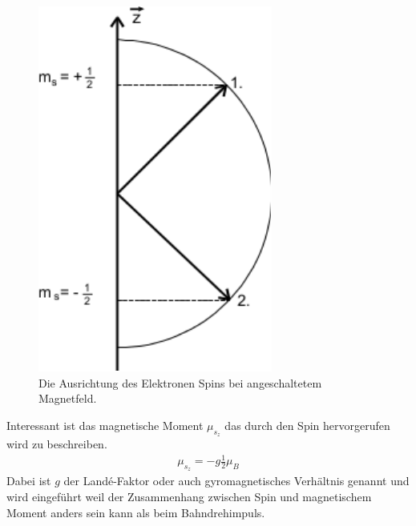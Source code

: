 \begin{figure}[h!]
\centering
\includegraphics[width=\textwidth/4]{../Grafiken/SpinElektron.pdf}
\caption{Die Ausrichtung des Elektronen Spins bei angeschaltetem Magnetfeld.\cite{V28}}\label{fig:ResonanzTheo}
\end{figure}
Interessant ist das magnetische Moment $\mu_{s_z}$ das durch den Spin hervorgerufen wird zu beschreiben.
\begin{align}
	\mu_{s_z}=-g\frac{1}{2}\mu_B\label{eq:musz}
\end{align}
Dabei ist $g$ der Landé-Faktor oder auch gyromagnetisches  Verhältnis genannt und wird eingeführt weil der Zusammenhang zwischen Spin und magnetischem Moment anders sein kann als beim Bahndrehimpuls.

